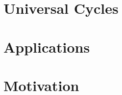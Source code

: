\section{Universal Cycles}\label{sec:universal_cycles}


\section{Applications }\label{sec:applications_de_bruijn}


\section{Motivation}\label{sec:time_synch_analyzed}











